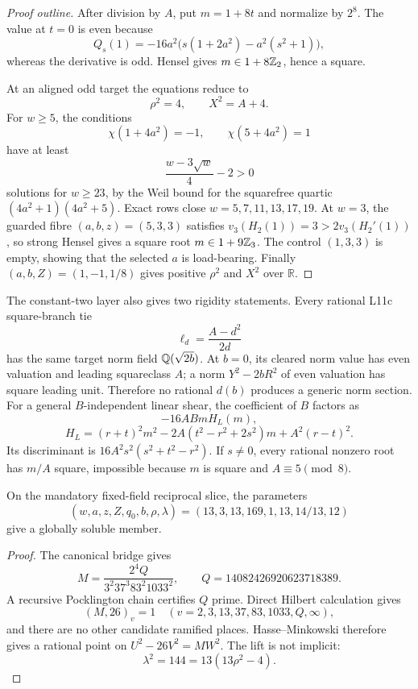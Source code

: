 \begin{proof}[Proof outline]
After division by \(A\), put \(m=1+8t\) and normalize by \(2^8\).
The value at \(t=0\) is even because
\[
 Q_s(1)=-16a^2\bigl(s(1+2a^2)-a^2(s^2+1)\bigr),
\]
whereas the derivative is odd.  Hensel gives
\(m\in1+8\mathbb{Z}_2\), hence a square.

At an aligned odd target the equations reduce to
\[
 \rho^2=4,\qquad X^2=A+4.
\]
For \(w\ge5\), the conditions
\[
 \chi(1+4a^2)=-1,\qquad \chi(5+4a^2)=1
\]
have at least
\[
 \frac{w-3\sqrt w}{4}-2>0
\]
solutions for \(w\ge23\), by the Weil bound for the squarefree quartic
\((4a^2+1)(4a^2+5)\).  Exact rows close
\(w=5,7,11,13,17,19\).  At \(w=3\), the guarded fibre
\((a,b,z)=(5,3,3)\) satisfies
\(v_3(H_2(1))=3>2v_3(H_2'(1))\), so strong Hensel gives a square
root \(m\in1+9\mathbb{Z}_3\).  The control \((1,3,3)\) is empty, showing that
the selected \(a\) is load-bearing.  Finally
\((a,b,Z)=(1,-1,1/8)\) gives positive \(\rho^2\) and \(X^2\) over
\(\mathbb R\).
\end{proof}

The constant-two layer also gives two rigidity statements.  Every
rational L11c square-branch tie
\[
 \ell_d=\frac{A-d^2}{2d}
\]
has the same target norm field \(\mathbb{Q}(\sqrt{2b})\).  At \(b=0\), its
cleared norm value has even valuation and leading squareclass \(A\);
a norm \(Y^2-2bR^2\) of even valuation has square leading unit.
Therefore no rational \(d(b)\) produces a generic norm section.
For a general \(B\)-independent linear shear, the coefficient of \(B\)
factors as
\[
 -16ABmH_L(m),
\]
\[
 H_L=(r+t)^2m^2-2A(t^2-r^2+2s^2)m+A^2(r-t)^2.
\]
Its discriminant is \(16A^2s^2(s^2+t^2-r^2)\).  If \(s\ne0\), every
rational nonzero root has \(m/A\) square, impossible because \(m\) is
square and \(A\equiv5\pmod8\).

\begin{theorem}
\label{thm:l31member}
On the mandatory fixed-field reciprocal slice, the parameters
\[
(w,a,z,Z,q_0,b,\rho,\lambda)
=(13,3,13,169,1,13,14/13,12)
\]
give a globally soluble member.
\end{theorem}

\begin{proof}
The canonical bridge gives
\[
M=\frac{2^4Q}{3^2 37^3 83^2 1033^2},\qquad
Q=14082426920623718389.
\]
A recursive Pocklington chain certifies \(Q\) prime.  Direct Hilbert
calculation gives
\[
(M,26)_v=1
\quad
(v=2,3,13,37,83,1033,Q,\infty),
\]
and there are no other candidate ramified places.  Hasse--Minkowski
therefore gives a rational point on \(U^2-26V^2=MW^2\).  The lift is
not implicit:
\[
\lambda^2=144=13(13\rho^2-4).
\]
\end{proof}

